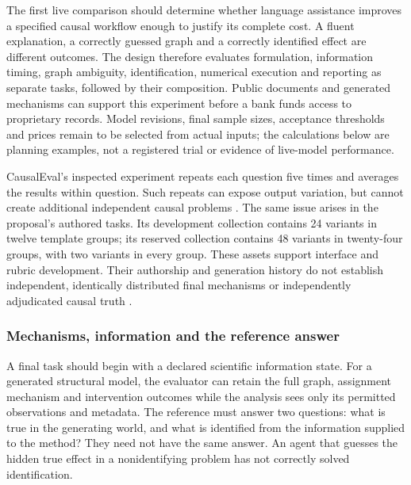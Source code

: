 \label{exec13:live-design}

The first live comparison should determine whether language assistance
improves a specified causal workflow enough to justify its complete
cost. A fluent explanation, a correctly guessed graph and a correctly
identified effect are different outcomes. The design therefore evaluates
formulation, information timing, graph ambiguity, identification,
numerical execution and reporting as separate tasks, followed by their
composition. Public documents and generated mechanisms can support this
experiment before a bank funds access to proprietary records. Model
revisions, final sample sizes, acceptance thresholds and prices remain
to be selected from actual inputs; the calculations below are planning
examples, not a registered trial or evidence of live-model performance.

CausalEval's inspected experiment repeats each question five times and
averages the results within question. Such repeats can expose output
variation, but cannot create additional independent causal problems
\citep{exec13_census_causaleval}. The same issue arises in the
proposal's authored tasks. Its development collection contains 24
variants in twelve template groups; its reserved collection contains 48
variants in twenty-four groups, with two variants in every group. These
assets support interface and rubric development. Their authorship and
generation history do not establish independent, identically distributed
final mechanisms or independently adjudicated causal truth
\citep{exec13_live_planning}.

\hypertarget{mechanisms-information-and-the-reference-answer}{%
\subsubsection{Mechanisms, information and the reference
answer}\label{mechanisms-information-and-the-reference-answer}}

A final task should begin with a declared scientific information state.
For a generated structural model, the evaluator can retain the full
graph, assignment mechanism and intervention outcomes while the analysis
sees only its permitted observations and metadata. The reference must
answer two questions: what is true in the generating world, and what is
identified from the information supplied to the method? They need not
have the same answer. An agent that guesses the hidden true effect in a
nonidentifying problem has not correctly solved identification.

